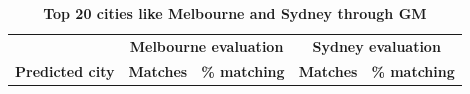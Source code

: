 \documentclass[Crown,sageh,times]{sagej}
\begin{document}
%






\begin{table}[!htbp]
\caption{\bf Top 20 cities like Melbourne and Sydney through GM \label{tab:melbournesydneyGM}}     
\begin{tabular}{ l l l l l}
 \hline    &  \multicolumn{2}{c}{\textbf{Melbourne evaluation}} & \multicolumn{2}{c}{\textbf{Sydney evaluation}}  \\  
\textbf{Predicted city} & \textbf{Matches} & \textbf{\% matching}  & \textbf{Matches} & \textbf{\% matching}\\ \hline


\end{tabular}
\end{table}
\end{document}
